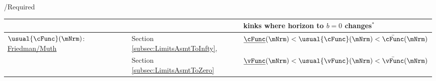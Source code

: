 \documentclass[\econtexRoot/BufferStockTheory]{subfiles}
\providecommand{\TblName}{}
\renewcommand{\TblName}{Required}
\begin{document}
\begin{verbatimwrite}{\TableDir/\TblName}
\begin{table}
{\begin{tabular}{|l|l|l|}
        \\                                                                                                                        &                                         & kinks where horizon to $b=0$ changes$^{\ast}$
        \\ \hline\hline \multicolumn{1}{|l|}{$\usual{\cFunc}(\mNrm)$:  \hyperlink{Uncertainty-Modified-Conditions}{Friedman/Muth}
        }                                                                                                                       & Section \ref{subsec:LimitsAsmtToInfty}, & $\underline{\cFunc}(\mNrm) < \usual{\cFunc}(\mNrm) < \bar{\cFunc}(\mNrm)$ %
        \\                                                                                                                      & Section \ref{subsec:LimitsAsmtToZero}   & $\underline{\vFunc}(\mNrm) < \usual{\vFunc}(\mNrm) < \bar{\vFunc}(\mNrm)$ %
                                                                                                                                                                       

\end{tabular}}
\end{table}
\end{verbatimwrite}
\end{document}
